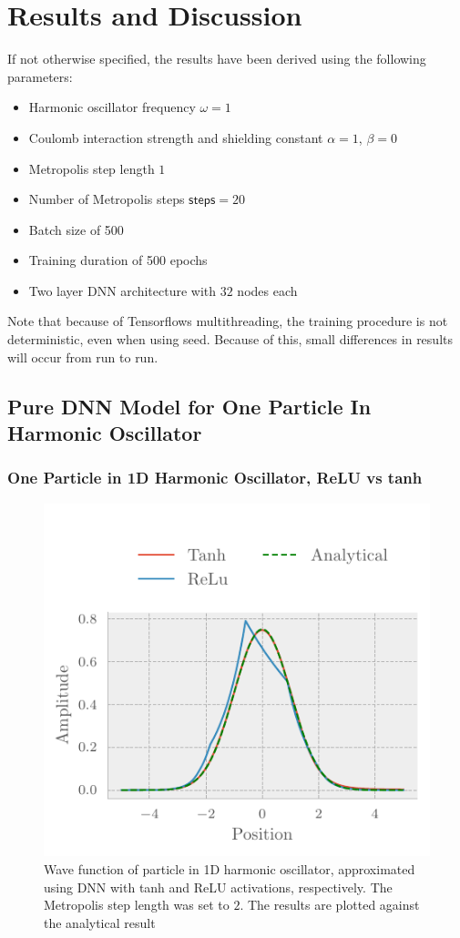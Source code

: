 \section{Results and Discussion}\label{sec:Discussion}

If not otherwise specified, the results have been derived using the following parameters:
\begin{itemize}
	\item Harmonic oscillator frequency $\omega = 1$
	\item Coulomb interaction strength and shielding constant $\alpha = 1$, $\beta = 0$
	\item Metropolis step length $1$
	\item Number of Metropolis steps $\textsf{steps} = 20$
	\item Batch size of 500
	\item Training duration of 500 epochs
	\item Two layer DNN architecture with $32$ nodes each  
\end{itemize}

Note that because of Tensorflows multithreading, the training procedure is not deterministic, even when using seed. Because of this, small differences in results will occur from run to run.

\subsection{Pure DNN Model for One Particle In Harmonic Oscillator}
\subsubsection{One Particle in 1D Harmonic Oscillator, ReLU vs tanh}

\begin{figure}[H]
	\includegraphics[]{figures/one_part_wavefunc.pdf}
	\caption{Wave function of particle in 1D harmonic oscillator, approximated using DNN with tanh and ReLU activations, respectively. The Metropolis step length was set to $2$. The results are plotted against the analytical result}
	\label{fig:one_part_func}
\end{figure}

